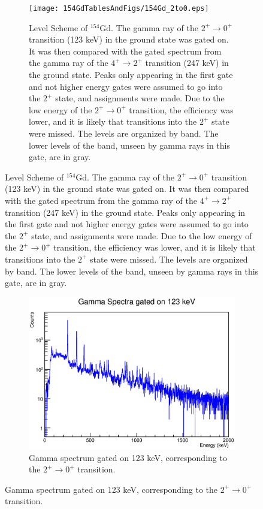 \begin{landscape}
\begin{figure}[!]
    \centering
    \begin{subfigure}{1.4\textwidth}
    \texttt{[image: 154GdTablesAndFigs/154Gd\_2to0.eps]}
    \caption{\label{fig:154_2to0level}Level Scheme of $^{154}$Gd. The gamma ray of the $2^+\rightarrow0^+$ transition (123 keV) in the ground state was gated on. It was then compared with the gated spectrum from the gamma ray of the $4^+\rightarrow2^+$ transition (247 keV) in the ground state. Peaks only appearing in the first gate and not higher energy gates were assumed to go into the $2^+$ state, and assignments were made. Due to the low energy of the $2^+\rightarrow0^+$ transition, the efficiency was lower, and it is likely that transitions into the $2^+$ state were missed. The levels are organized by band. The lower levels of the band, unseen by gamma rays in this gate, are in gray.}
    \end{subfigure}
    \label{fig:154_2to0}
    \end{figure}
    \begin{figure}
    \ContinuedFloat
    \begin{subfigure}{1.4\textwidth}
    \includegraphics[]{154GdTablesAndFigs/123GateSpectrum.eps}
    \caption{Gamma spectrum gated on 123 keV, corresponding to the $2^+\rightarrow0^+$ transition.}
    \label{fig:154_2to0spec}
    \end{subfigure}
\end{figure}
\end{landscape}